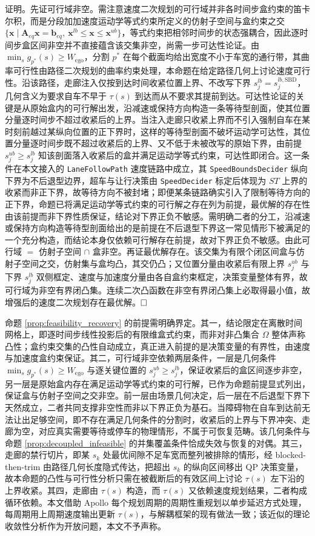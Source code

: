 \documentclass[a4paper,11pt]{ctexart}
\theoremstyle{definition}
\begin{document}
证明。先证可行域非空。需注意速度二次规划的可行域并非各时间步盒约束的笛卡尔积，而是分段加加速度运动学等式约束所定义的仿射子空间与盒约束之交 $\{\mathbf{x}\mid \mathbf{A}_{eq}\mathbf{x}=\mathbf{b}_{eq},\ \mathbf{x}^{lb}\le\mathbf{x}\le\mathbf{x}^{ub}\}$，等式约束把相邻时间步的状态强耦合，因此逐时间步盒区间非空并不直接蕴含该交集非空，尚需一步可达性论证。由 $\min_s g_{p^{*}}(s) \geq W_{\text{ego}}$，分割 $p^{*}$ 在每个截面均给出宽度不小于车宽的通行带，其曲率可行性由路径二次规划的曲率约束处理，本命题在给定路径几何上讨论速度可行性。沿该路径，走廊注入仅按到达时间收紧位置上界、不改写下界 $s_j^{lb}=s_j^{lb,\mathrm{SBD}}$，几何含义为要求自车不早于 $\tau(s)$ 到达而从不要求其提前到达。可达性论证的关键是从原始盒内的可行解出发，沿减速或保持方向构造一条等待型剖面，使其位置分量逐时间步不超过收紧后的上界。当注入走廊只收紧上界而不引入强制自车在某时刻前越过某纵向位置的正下界时，这样的等待型剖面不破坏运动学可达性，其位置分量逐时间步既不超过收紧后的上界、又不低于未被改写的原始下界，由前提 $s_j^{ub} \geq s_j^{lb}$ 知该剖面落入收紧后的盒并满足运动学等式约束，可达性即闭合。这一条件在本文接入的 \texttt{LaneFollowPath} 速度链路中成立，其 \texttt{SpeedBoundsDecider} 纵向下界为不后退型边界，超车与让行决策由 \texttt{SpeedDecider} 标定后体现为 $ST$ 上界的收紧而非正下界，故等待方向不被封堵；即便某条链路确实引入了限制等待方向的正下界，命题已将满足运动学等式约束的可行解之存在列为前提，最优解的存在性由该前提而非下界性质保证，结论对下界正负不敏感。需明确二者的分工，沿减速或保持方向构造等待型剖面给出的是前提在不后退型下界这一常见情形下被满足的一个充分构造，而结论本身仅依赖可行解存在前提，故对下界正负不敏感。由此可行域 $=$ 仿射子空间 $\cap$ 盒非空。再证最优解存在。该交集为有限个闭区间盒与仿射子空间之交，仿射集与盒均凸，其交仍凸；又位置分量由收紧后有限上界 $s_j^{ub}$ 与下界 $s_j^{lb}$ 双侧框定、速度与加速度分量由各自盒约束框定，决策变量整体有界，故可行域为非空有界闭凸集。连续二次凸函数在非空有界闭凸集上必取得最小值，故增强后的速度二次规划存在最优解。$\hfill\Box$

命题 \ref{prop:feasibility_recovery} 的前提需明确界定。其一，结论限定在离散时间网格上，即逐时间步线性投影后的有限维盒式约束，而非对非凸集合 $\Omega$ 整体声称凸性；盒约束交集的凸性自动成立，真正进入前提的是决策变量的有界性，由速度与加速度盒约束保证。其二，可行域非空依赖两层条件，一层是几何条件 $\min_s g_{p^{*}}(s) \geq W_{\text{ego}}$ 与逐关键位置的 $s_j^{ub} \geq s_j^{lb}$，保证收紧后的盒区间逐步非空，另一层是原始盒内存在满足运动学等式约束的可行解，已作为命题前提显式列出，保证盒与仿射子空间之交非空。前一层由场景几何决定，后一层在不后退型下界下天然成立，二者共同支撑非空性而非以下界正负为基石。当障碍物在自车到达前无法让出足够空间，即不存在满足几何条件的分割时，收紧后的上界与下界冲突、走廊为空，对应真实需要等待或停车的物理情形，不属于可恢复范畴。该几何条件与命题 \ref{prop:decoupled_infeasible} 的并集覆盖条件恰成失效与恢复的对偶。其三，走廊的禁行切片，即某 $s_k$ 处最优间隙不足车宽而整列被排除的情形，经 blocked-then-trim 由路径几何长度隐式传达，把超出 $s_k$ 的纵向区间移出 QP 决策变量，故本命题的凸性与可行性分析只需在被截断后的有效区间上讨论 $\tau(s)$ 左下沿的上界收紧。其四，走廊由 $\tau(s)$ 构造，而 $\tau(s)$ 又依赖速度规划结果，二者构成循环依赖。本文借助 Apollo 每个规划周期的周期性重规划以单步延迟方式处理，每周期用上周期速度输出更新 $\tau(s)$，与解耦框架的现有做法一致；该近似的理论收敛性分析作为开放问题，本文不予声称。
\end{document}
